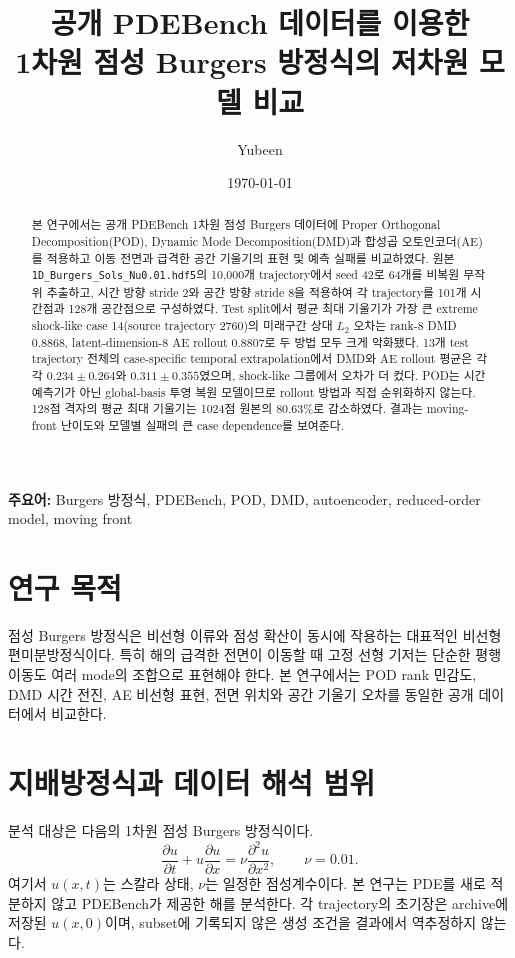 \documentclass[11pt,a4paper]{article}
\title{공개 PDEBench 데이터를 이용한\\1차원 점성 Burgers 방정식의 저차원 모델 비교}
\author{Yubeen}
\date{\today}
\begin{document}
\maketitle

\begin{abstract}
본 연구에서는 공개 PDEBench 1차원 점성 Burgers 데이터에 Proper Orthogonal Decomposition(POD), Dynamic Mode Decomposition(DMD)과 합성곱 오토인코더(AE)를 적용하고 이동 전면과 급격한 공간 기울기의 표현 및 예측 실패를 비교하였다. 원본 \texttt{1D\_Burgers\_Sols\_Nu0.01.hdf5}의 10,000개 trajectory에서 seed 42로 64개를 비복원 무작위 추출하고, 시간 방향 stride 2와 공간 방향 stride 8을 적용하여 각 trajectory를 101개 시간점과 128개 공간점으로 구성하였다. Test split에서 평균 최대 기울기가 가장 큰 extreme shock-like case 14(source trajectory 2760)의 미래구간 상대 $L_2$ 오차는 rank-8 DMD 0.8868, latent-dimension-8 AE rollout 0.8807로 두 방법 모두 크게 악화됐다. 13개 test trajectory 전체의 case-specific temporal extrapolation에서 DMD와 AE rollout 평균은 각각 $0.234\pm0.264$와 $0.311\pm0.355$였으며, shock-like 그룹에서 오차가 더 컸다. POD는 시간 예측기가 아닌 global-basis 투영 복원 모델이므로 rollout 방법과 직접 순위화하지 않는다. 128점 격자의 평균 최대 기울기는 1024점 원본의 80.63\%로 감소하였다. 결과는 moving-front 난이도와 모델별 실패의 큰 case dependence를 보여준다.
\end{abstract}

\noindent\textbf{주요어:} Burgers 방정식, PDEBench, POD, DMD, autoencoder, reduced-order model, moving front

\section{연구 목적}

점성 Burgers 방정식은 비선형 이류와 점성 확산이 동시에 작용하는 대표적인 비선형 편미분방정식이다. 특히 해의 급격한 전면이 이동할 때 고정 선형 기저는 단순한 평행이동도 여러 mode의 조합으로 표현해야 한다. 본 연구에서는 POD rank 민감도, DMD 시간 전진, AE 비선형 표현, 전면 위치와 공간 기울기 오차를 동일한 공개 데이터에서 비교한다.

\section{지배방정식과 데이터 해석 범위}

분석 대상은 다음의 1차원 점성 Burgers 방정식이다.
\begin{equation}
  \frac{\partial u}{\partial t}
  +u\frac{\partial u}{\partial x}
  =\nu\frac{\partial^2u}{\partial x^2},
  \qquad \nu=0.01.
\end{equation}
여기서 $u(x,t)$는 스칼라 상태, $\nu$는 일정한 점성계수이다. 본 연구는 PDE를 새로 적분하지 않고 PDEBench가 제공한 해를 분석한다. 각 trajectory의 초기장은 archive에 저장된 $u(x,0)$이며, subset에 기록되지 않은 생성 조건을 결과에서 역추정하지 않는다.
\end{document}
